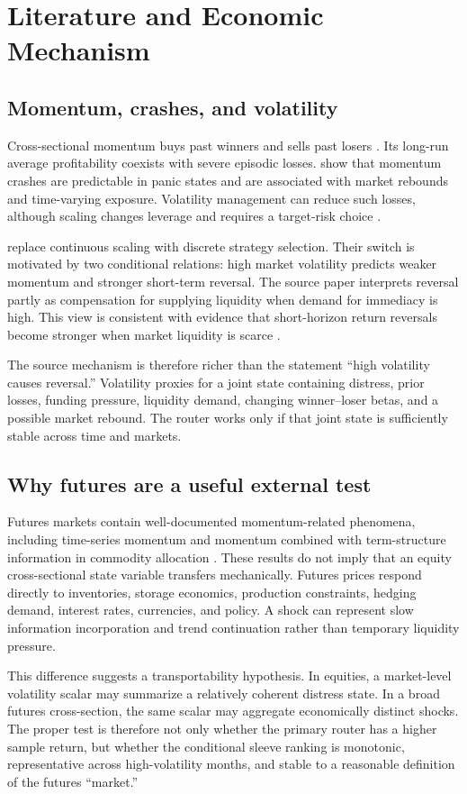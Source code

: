 \section{Literature and Economic Mechanism}

\subsection{Momentum, crashes, and volatility}

Cross-sectional momentum buys past winners and sells past losers
\citep{jegadeesh1993}. Its long-run average profitability coexists with severe episodic
losses. \citet{daniel2016} show that momentum crashes are predictable in panic states
and are associated with market rebounds and time-varying exposure. Volatility management
can reduce such losses, although scaling changes leverage and requires a target-risk
choice \citep{barroso2015}.

\citet{butt2023} replace continuous scaling with discrete strategy selection. Their
switch is motivated by two conditional relations: high market volatility predicts weaker
momentum and stronger short-term reversal. The source paper interprets reversal partly as
compensation for supplying liquidity when demand for immediacy is high. This view is
consistent with evidence that short-horizon return reversals become stronger when market
liquidity is scarce \citep{nagel2012,jegadeesh1990,lehmann1990}.

The source mechanism is therefore richer than the statement ``high volatility causes
reversal.'' Volatility proxies for a joint state containing distress, prior losses,
funding pressure, liquidity demand, changing winner--loser betas, and a possible market
rebound. The router works only if that joint state is sufficiently stable across time and
markets.

\subsection{Why futures are a useful external test}

Futures markets contain well-documented momentum-related phenomena, including time-series
momentum \citep{moskowitz2012} and momentum combined with term-structure information in
commodity allocation \citep{fuertes2010}. These results do not imply that an equity
cross-sectional state variable transfers mechanically. Futures prices respond directly
to inventories, storage economics, production constraints, hedging demand, interest
rates, currencies, and policy. A shock can represent slow information incorporation and
trend continuation rather than temporary liquidity pressure.

This difference suggests a transportability hypothesis. In equities, a market-level
volatility scalar may summarize a relatively coherent distress state. In a broad futures
cross-section, the same scalar may aggregate economically distinct shocks. The proper
test is therefore not only whether the primary router has a higher sample return, but
whether the conditional sleeve ranking is monotonic, representative across high-volatility
months, and stable to a reasonable definition of the futures ``market.''
